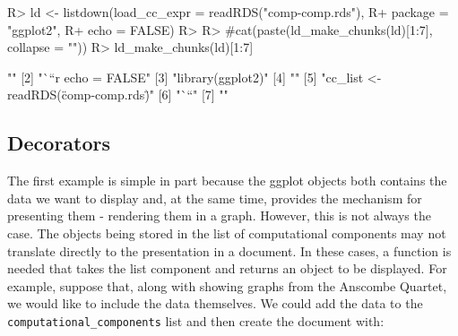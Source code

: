 \documentclass[
]{jss}
\begin{document}
\begin{CodeChunk}

\begin{CodeInput}
R> ld <- listdown(load_cc_expr = readRDS("comp-comp.rds"), 
R+                package = "ggplot2",
R+                echo = FALSE)
R> 
R> #cat(paste(ld_make_chunks(ld)[1:7], collapse = "\n"))
R> ld_make_chunks(ld)[1:7]
\end{CodeInput}

\begin{CodeOutput}
[1] ""                                     
[2] "```{r echo = FALSE}"                  
[3] "library(ggplot2)"                     
[4] ""                                     
[5] "cc_list <- readRDS(\"comp-comp.rds\")"
[6] "```"                                  
[7] ""                                     
\end{CodeOutput}
\end{CodeChunk}

\hypertarget{decorators}{%
\subsection{Decorators}\label{decorators}}

The first example is simple in part because the ggplot objects both
contains the data we want to display and, at the same time, provides the
mechanism for presenting them - rendering them in a graph. However, this
is not always the case. The objects being stored in the list of
computational components may not translate directly to the presentation
in a document. In these cases, a function is needed that takes the list
component and returns an object to be displayed. For example, suppose
that, along with showing graphs from the Anscombe Quartet, we would like
to include the data themselves. We could add the data to the
\texttt{computational\_components} list and then create the document
with:

\begin{CodeChunk}


\end{CodeChunk}
\end{document}

